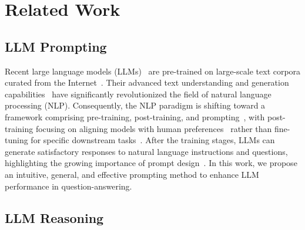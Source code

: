\section{Related Work}
\label{sec:related_work}

\subsection{LLM Prompting}

Recent large language models (LLMs)~\cite{dubey2024llama3,lambert2024tulu3,liu2024deepseek_v3} are pre-trained on large-scale text corpora curated from the Internet~\cite{soldaini2024dolma,penedo2024fineweb,weber2024redpajama}. %
Their advanced text understanding and generation capabilities~\cite{hurst2024gpt4o,anthropic2024claude3,team2024gemini1_5} have significantly revolutionized the field of natural language processing (NLP).
Consequently, the NLP paradigm is shifting toward a framework comprising pre-training, post-training, and prompting~\cite{liu2023prompt}, with post-training focusing on aligning models with human preferences~\cite{ouyang2022rlhf,bai2022rlaif,rafailov2023dpo} rather than fine-tuning for specific downstream tasks~\cite{devlin2019bert}.
After the training stages, LLMs can generate satisfactory responses to natural language instructions and questions, highlighting the growing importance of prompt design~\cite{white2023prompt,giray2023prompt,sahoo2024prompt}.
In this work, we propose an intuitive, general, and effective prompting method to enhance LLM performance in question-answering.

\subsection{LLM Reasoning}

